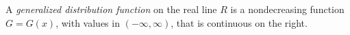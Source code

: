 A \textit{generalized distribution function} on the real line $R$ is a nondecreasing function $G = G(x)$, with values in $(-\infty, \infty)$, that is continuous on the right.
